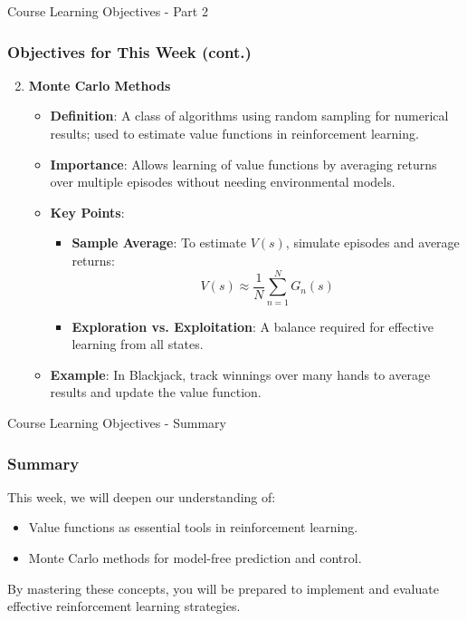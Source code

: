 \documentclass[aspectratio=169]{beamer}
\begin{document}
\begin{frame}[fragile]{Course Learning Objectives - Part 2}
    \frametitle{Objectives for This Week (cont.)}

    \begin{enumerate}
        \setcounter{enumi}{1}
        \item \textbf{Monte Carlo Methods}
        \begin{itemize}
            \item \textbf{Definition}: A class of algorithms using random sampling for numerical results; used to estimate value functions in reinforcement learning.
            \item \textbf{Importance}: Allows learning of value functions by averaging returns over multiple episodes without needing environmental models.
            \item \textbf{Key Points}:
            \begin{itemize}
                \item \textbf{Sample Average}: To estimate \( V(s) \), simulate episodes and average returns:
                \begin{equation}
                V(s) \approx \frac{1}{N} \sum_{n=1}^{N} G_n(s)
                \end{equation}
                \item \textbf{Exploration vs. Exploitation}: A balance required for effective learning from all states.
            \end{itemize}
            \item \textbf{Example}: In Blackjack, track winnings over many hands to average results and update the value function.
        \end{itemize}
    \end{enumerate}
\end{frame}

\begin{frame}[fragile]{Course Learning Objectives - Summary}
    \frametitle{Summary}

    This week, we will deepen our understanding of:
    \begin{itemize}
        \item Value functions as essential tools in reinforcement learning.
        \item Monte Carlo methods for model-free prediction and control.
    \end{itemize}
    By mastering these concepts, you will be prepared to implement and evaluate effective reinforcement learning strategies.

\end{frame}
\end{document}
